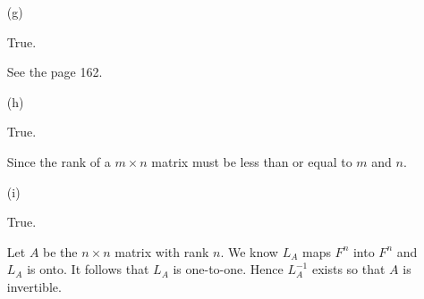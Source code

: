 \begin{Exercise}
\begin{enumerate}[(a)]
		\item[(g)]
		\begin{answer}
			True.
		\end{answer}
		\begin{solution}
			See the page 162.
		\end{solution}
		
		\item[(h)]
		\begin{answer}
			True.
		\end{answer}
		\begin{solution}
			Since the rank of a $m\times n$ matrix must be less than or equal to $m$ and $n$.
		\end{solution}
		
		\item[(i)]
		\begin{answer}
			True.
		\end{answer}
		\begin{solution}
			Let $A$ be the $n\times n$ matrix with rank $n$. We know $L_A$ maps $F^n$ into $F^n$ and $L_A$ is onto. It follows that $L_A$ is one-to-one. Hence $L_A^{-1}$ exists so that $A$ is invertible.
		\end{solution}
		
	\end{enumerate}
\end{Exercise}